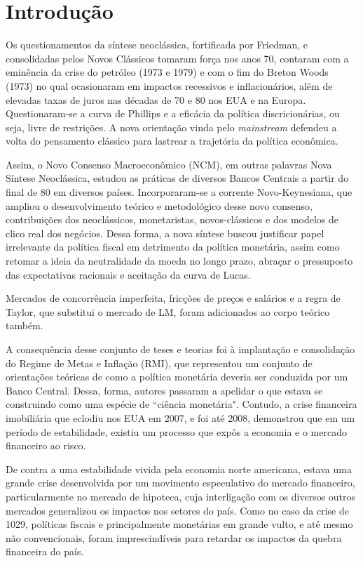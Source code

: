 \documentclass[report]{uftex}
\begin{document}
\section{Introdução}

Os questionamentos da síntese neoclássica, fortificada por Friedman, e consolidadas pelos Novos Clássicos tomaram força nos anos 70, contaram com a eminência da crise do petróleo (1973 e 1979) e com o fim do Breton Woods (1973) no qual ocasionaram em impactos recessivos e inflacionários, além de elevadas taxas de juros nas décadas de 70 e 80 nos EUA e na Europa. Questionaram-se a curva de Phillips e a eficácia da política discricionárias, ou seja, livre de restrições. A nova orientação vinda pelo \textit{mainstream} defendeu a volta do pensamento clássico para lastrear a trajetória da política econômica. 

Assim, o Novo Consenso Macroeconômico (NCM), em outras palavras Nova Síntese Neoclássica, estudou as práticas de diversos Bancos Centrais a partir do final de 80 em diversos países. Incorporaram-se a corrente Novo-Keynesiana, que ampliou o desenvolvimento teórico e metodológico desse novo consenso, contribuições dos neoclássicos, monetaristas, novos-clássicos e dos modelos de clico real dos negócios. Dessa forma, a nova síntese buscou justificar papel irrelevante da política fiscal em detrimento da política monetária, assim como retomar a ideia da neutralidade da moeda no longo prazo, abraçar o pressuposto das expectativas racionais e aceitação da curva de Lucas.

Mercados de concorrência imperfeita, fricções de preços e salários e a regra de Taylor, que substitui o mercado de LM, foram adicionados ao corpo teórico também.

A consequência desse conjunto de teses e teorias foi à implantação e consolidação do Regime de Metas e Inflação (RMI), que representou um conjunto de orientações teóricas de como a política monetária deveria ser conduzida por um Banco Central. Dessa, forma, autores passaram a apelidar o que estava se construindo como uma espécie de ``ciência monetária". Contudo, a crise financeira imobiliária que eclodiu nos EUA em 2007, e foi até 2008, demonstrou que em um período de estabilidade, existiu um processo que expôs a economia e o mercado financeiro ao risco.

De contra a uma estabilidade vivida pela economia norte americana, estava uma grande crise desenvolvida por um movimento especulativo do mercado financeiro, particularmente no mercado de hipoteca, cuja interligação com os diversos outros mercados generalizou os impactos nos setores do país. Como no caso da crise de 1029, políticas fiscais e principalmente monetárias em grande vulto, e até mesmo não convencionais, foram imprescindíveis para retardar os impactos da quebra financeira do país.
\end{document}
